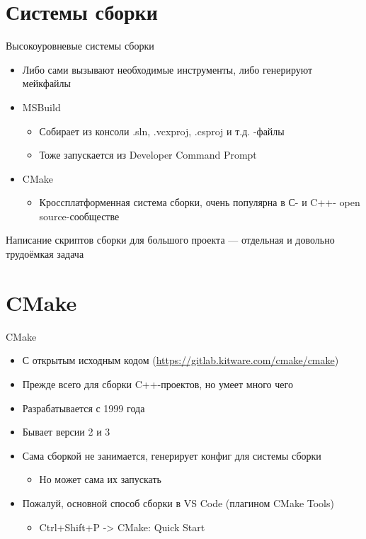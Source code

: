 \documentclass{../../slides-style}
\begin{document}
    \section{Системы сборки}

    \begin{frame}{Высокоуровневые системы сборки}
        \begin{itemize}
            \item Либо сами вызывают необходимые инструменты, либо генерируют мейкфайлы
            \item MSBuild
            \begin{itemize}
                \item Собирает из консоли .sln, .vcxproj, .csproj и т.д. -файлы
                \item Тоже запускается из Developer Command Prompt
            \end{itemize}
            \item CMake
            \begin{itemize}
                \item Кроссплатформенная система сборки, очень популярна в С- и C++- open source-сообществе
            \end{itemize}
        \end{itemize}
        Написание скриптов сборки для большого проекта --- отдельная и довольно трудоёмкая задача
    \end{frame}

    \section{CMake}

    \begin{frame}{CMake}
        \begin{itemize}
            \item С открытым исходным кодом (\url{https://gitlab.kitware.com/cmake/cmake})
            \item Прежде всего для сборки C++-проектов, но умеет много чего
            \item Разрабатывается с 1999 года
            \item Бывает версии 2 и 3
            \item Сама сборкой не занимается, генерирует конфиг для системы сборки
            \begin{itemize}
                \item Но может сама их запускать
            \end{itemize}
            \item Пожалуй, основной способ сборки в VS Code (плагином CMake Tools)
            \begin{itemize}
                \item Ctrl+Shift+P -> CMake: Quick Start
            \end{itemize}
        \end{itemize}
    \end{frame}
\end{document}
